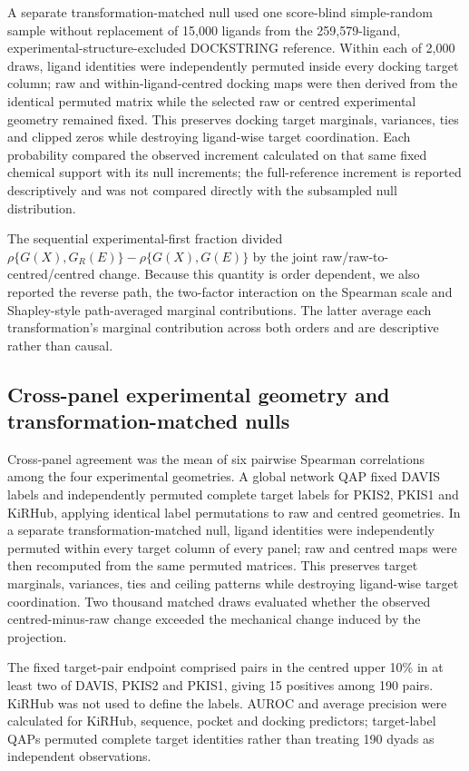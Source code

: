 \documentclass[11pt]{article}
\begin{document}
A separate transformation-matched null used one score-blind simple-random sample without
replacement of 15,000 ligands from the 259,579-ligand, experimental-structure-excluded
DOCKSTRING reference. Within each of 2,000 draws, ligand identities were independently
permuted inside every docking target column; raw and within-ligand-centred docking maps were
then derived from the identical permuted matrix while the selected raw or centred
experimental geometry remained fixed. This preserves docking target marginals, variances,
ties and clipped zeros while destroying ligand-wise target coordination. Each probability
compared the observed increment calculated on that same fixed chemical support with its
null increments; the full-reference increment is reported descriptively and was not
compared directly with the subsampled null distribution.

The sequential experimental-first fraction divided
$\rho\{G(X),G_R(E)\}-\rho\{G(X),G(E)\}$ by the joint raw/raw-to-centred/centred change.
Because this quantity is order dependent, we also reported the reverse path, the two-factor
interaction on the Spearman scale and Shapley-style path-averaged marginal contributions.
The latter average each transformation's marginal contribution across both orders and are
descriptive rather than causal.

\subsection{Cross-panel experimental geometry and transformation-matched nulls}

Cross-panel agreement was the mean of six pairwise Spearman correlations among the
four experimental geometries. A global network QAP fixed DAVIS labels and independently
permuted complete target labels for PKIS2, PKIS1 and KiRHub, applying identical label
permutations to raw and centred geometries. In a separate transformation-matched null,
ligand identities were independently permuted within every target column of every panel;
raw and centred maps were then recomputed from the same permuted matrices. This preserves
target marginals, variances, ties and ceiling patterns while destroying ligand-wise target
coordination. Two thousand matched draws evaluated whether the observed centred-minus-raw
change exceeded the mechanical change induced by the projection.

The fixed target-pair endpoint comprised pairs in the centred upper 10\% in at least two of
DAVIS, PKIS2 and PKIS1, giving 15 positives among 190 pairs. KiRHub was not used to define
the labels. AUROC and average precision were calculated for KiRHub, sequence, pocket and
docking predictors; target-label QAPs permuted complete target identities rather than
treating 190 dyads as independent observations.
\end{document}
